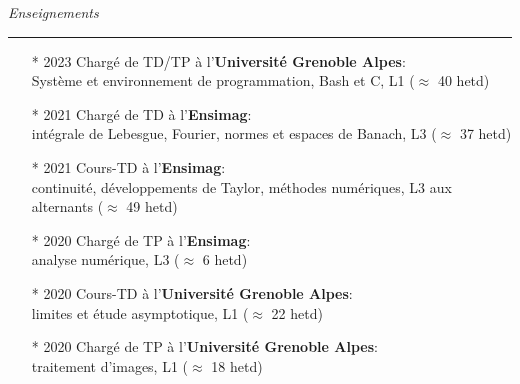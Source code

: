 {	\vspace{5mm}
	
	
	\noindent
	\textit{\Large \color{MyGray} \hspace{5mm} Enseignements}
	\vspace{2mm}
	{\color{DefaultGray}\hrule height .1pt}
	\vspace{4mm}
	
	\begin{itemize}
		\setlength\itemsep{3mm}
		\item[*] 2023 Chargé de TD/TP à l'\textbf{Université Grenoble Alpes}:\\
		Système et environnement de programmation, Bash et C, L1 ($\approx$ 40 hetd)
		\item[*] 2021 Chargé de TD à l'\textbf{Ensimag}:\\
		intégrale de Lebesgue, Fourier, normes et espaces de Banach, L3 ($\approx$ 37 hetd)
		\item[*] 2021 Cours-TD à l'\textbf{Ensimag}:\\
		continuité, développements de Taylor, méthodes numériques, L3 aux alternants ($\approx$ 49 hetd)
		\item[*] 2020 Chargé de TP à l'\textbf{Ensimag}:\\ analyse numérique, L3 ($\approx$ 6 hetd)
		\item[*] 2020 Cours-TD à l'\textbf{Université Grenoble Alpes}:\\
		limites et étude asymptotique, L1 ($\approx$ 22 hetd)
		\item[*] 2020 Chargé de TP à l'\textbf{Université Grenoble Alpes}:\\
		traitement d'images, L1 ($\approx$ 18 hetd)
	\end{itemize}
	
	\vspace{5mm}
	
}
